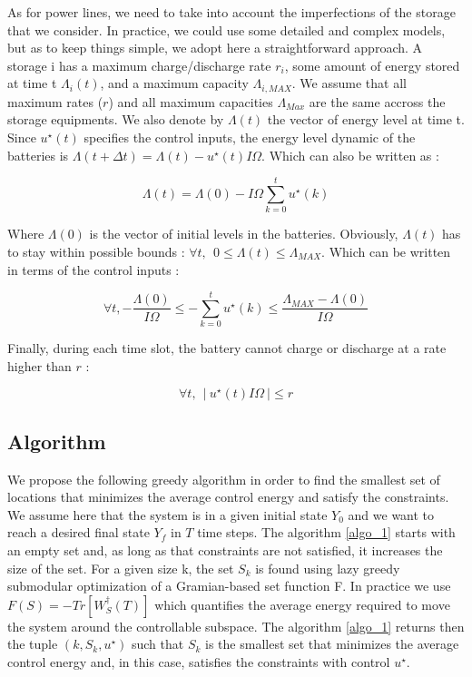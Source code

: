 \documentclass[conference]{IEEEtran}
\begin{document}
As for power lines, we need to take into account the imperfections of the storage that we consider. In practice, we could use some detailed and complex models, but as to keep things simple, we adopt here a straightforward approach. A storage i has a maximum charge/discharge rate $r_i$, some amount of energy stored at time t $ \Lambda_i(t) $, and a maximum capacity $ \Lambda_{i, MAX} $. We assume that all maximum rates ($r$) and all maximum capacities $\Lambda_{Max}$ are the same accross the storage equipments. We also denote by $ \Lambda(t) $ the vector of energy level at time t. Since $ u^{\star}(t) $ specifies the control inputs, the energy level dynamic of the batteries is $ \Lambda(t+\Delta t) = \Lambda(t) - u^{\star}(t) I \Omega $. Which can also be written as :

\begin{equation}
\Lambda(t)  = \Lambda(0) - I \Omega \sum_{k=0}^{t}u^{\star}(k)
\end{equation}

Where $ \Lambda(0) $ is the vector of initial levels in the batteries. Obviously, $\Lambda(t)$ has to stay within possible bounds : $ \forall t, \ \ 0 \leq \Lambda(t) \leq \Lambda_{MAX} $. Which can be written in terms of the control inputs :

\begin{equation}
\label{level_constraints}
\forall t,-\frac{\Lambda(0)}{I \Omega} \leq -\sum_{k=0}^{t}u^{\star}(k) \leq \frac{ \Lambda_{MAX} - \Lambda(0)}{I \Omega}
\end{equation}

Finally, during each time slot, the battery cannot charge or discharge at a rate higher than $ r $ : 

\begin{equation}
\label{rate_constraints}
 \forall t,\ \ \left|\ u^{\star}(t)I \Omega\ \right| \leq r 
 \end{equation}

\subsection{Algorithm}

We propose the following greedy algorithm in order to find the smallest set of locations that minimizes the average control energy and satisfy the constraints. We assume here that the system is in a given initial state $ Y_0 $ and we want to reach a desired final state $ Y_f$  in $ T $ time steps. The algorithm \ref{algo_1} starts with an empty set and, as long as that constraints are not satisfied, it increases the size of the set. For a given size k, the set $ S_k $ is found using lazy greedy submodular optimization of a Gramian-based set function F. In practice we use $ F(S) = -Tr \left[ W_S^{\dagger}(T) \right] $ which quantifies the average energy required to move the system around the controllable subspace. The algorithm \ref{algo_1} returns then the tuple $ (k,S_k,u^{\star}) $ such that $ S_k $ is the smallest set that minimizes the average control energy and, in this case, satisfies the constraints with control $u^{\star}$. 
\end{document}
